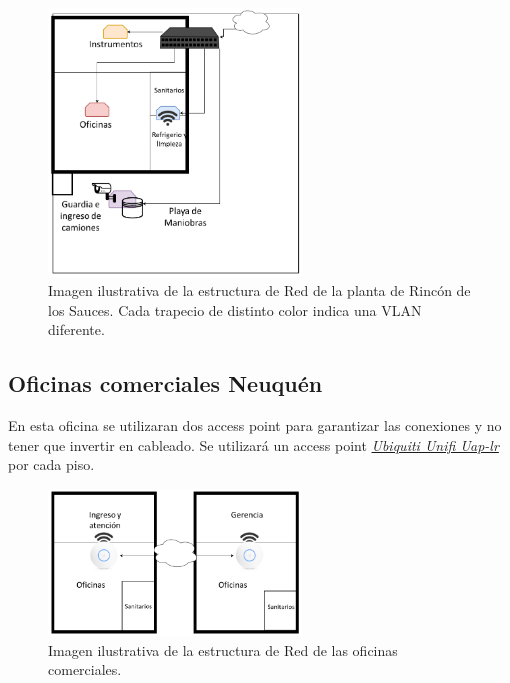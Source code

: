 \documentclass[11pt]{article}
\begin{document}
    \begin{figure}[H]
        \centering
        \includegraphics[width=0.6\textwidth]{Figure/Parque_Industrial.png}
        \caption{Imagen ilustrativa de la estructura de Red de la planta de Rincón de los Sauces. Cada trapecio de distinto color indica una VLAN diferente.}
    \end{figure}

    \subsection{Oficinas comerciales Neuquén}

    En esta oficina se utilizaran dos access point para garantizar las conexiones y no tener que invertir en cableado. Se utilizará un access point 
    \href{https://www.mercadolibre.com.ar/access-point-interior-ubiquiti-networks-unifi-ac-lr-ap-uap-ac-lr-blanco-1-unidad/p/MLA7953376?pdp_filters=category:MLA1700#searchVariation=MLA7953376&position=1&type=product&tracking_id=933ff74a-93c5-4a58-9a31-9fe5a3c5746e}{\textit{Ubiquiti Unifi Uap-lr}}
    por cada piso.

    \begin{figure}[H]
        \centering
        \includegraphics[width=0.6\textwidth]{Figure/Centrales_Neuquen.png}
        \caption{Imagen ilustrativa de la estructura de Red de las oficinas comerciales.}
    \end{figure}
\end{document}
